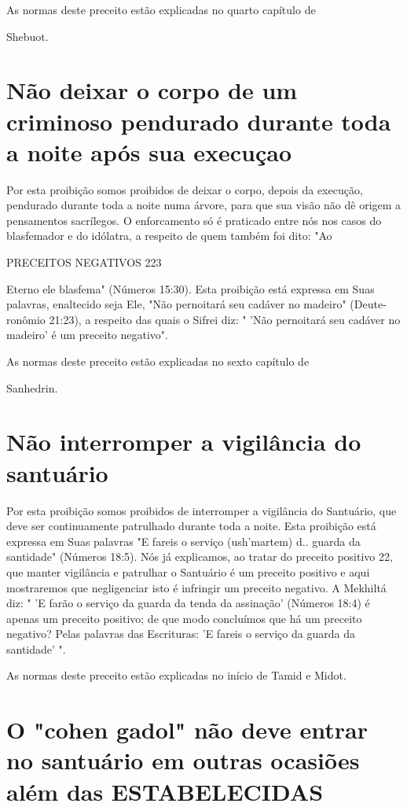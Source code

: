 \begin{itemize}
\begin{enumrate}
\begin{itemize}
\begin{itemize}
\begin{itemize}
As normas deste preceito estão explicadas no quarto capítulo de


Shebuot.

\section{Não deixar o corpo de um criminoso pendurado durante 
toda a noite após sua execuçao}

Por esta proibição somos proibidos de deixar o corpo, depois da
exe­cução, pendurado durante toda a noite numa árvore, para que sua
visão não dê origem a pensamentos sacrílegos. O enforcamento só é
praticado entre nós nos casos do blasfemador e do idólatra, a respeito
de quem também foi dito: "Ao

PRECEITOS NEGATIVOS 223

Eterno ele blasfema" (Números 15:30). Esta proibição está expressa em
Suas palavras, enaltecido seja Ele, "Não pernoitará seu cadáver no
madeiro" (Deute­ronômio 21:23), a respeito das quais o Sifrei diz: "
'Não pernoitará seu cadáver no madeiro' é um preceito negativo".


As normas deste preceito estão explicadas no sexto capítulo de


Sanhedrin.

\section{Não interromper a vigilância do santuário}

Por esta proibição somos proibidos de interromper a vigilância do
Santuário, que deve ser continuamente patrulhado durante toda a noite.
Esta proibição está expressa em Suas palavras "E fareis o serviço
(ush'martem) d.. guarda da santidade" (Números 18:5). Nós já explicamos,
ao tratar do preceito positivo 22, que manter vigilância e patrulhar o
Santuário é um preceito positi­vo e aqui mostraremos que negligenciar
isto é infringir um preceito negativo. A Mekhiltá diz: " 'E farão o
serviço da guarda da tenda da assinação' (Números 18:4) é apenas um
preceito positivo; de que modo concluímos que há um pre­ceito negativo?
Pelas palavras das Escrituras: 'E fareis o serviço da guarda da
santidade' ".


As normas deste preceito estão explicadas no início de Tamid e Midot.


\section{O "cohen gadol" não deve entrar no santuário 
em outras ocasiões além das ESTABELECIDAS}


\end{itemize}
\end{itemize}
\end{itemize}
\end{enumrate}
\end{itemize}
